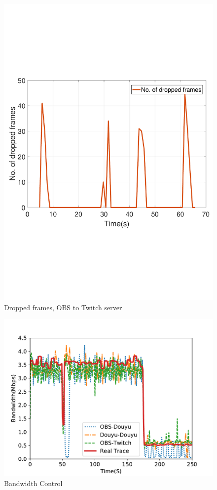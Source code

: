 \begin{figure}[htb]
  \includegraphics[width=\linewidth]{fig/obs_twitch_drop.pdf}
  \caption{Dropped frames, OBS to Twitch server}
  \label{fig:obs-twitch-drop}
\endminipage
\end{figure}

\begin{figure}[htb]
\centering
\includegraphics[width=.8\columnwidth]{fig/vary-bandwidth.pdf}
\caption{Bandwidth Control}
\label{fig:vary-bandwidth}
\end{figure}

